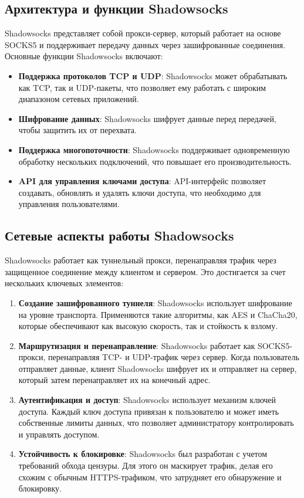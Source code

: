 \documentclass{SCWorks}
\begin{document}
\subsection{Архитектура и функции Shadowsocks}

Shadowsocks представляет собой прокси-сервер, который работает на основе SOCKS5 и поддерживает передачу данных через зашифрованные соединения. Основные функции Shadowsocks включают:

\begin{itemize}
    \item \textbf{Поддержка протоколов TCP и UDP}: Shadowsocks может обрабатывать как TCP, так и UDP-пакеты, что позволяет ему работать с широким диапазоном сетевых приложений.
    \item \textbf{Шифрование данных}: Shadowsocks шифрует данные перед передачей, чтобы защитить их от перехвата.
    \item \textbf{Поддержка многопоточности}: Shadowsocks поддерживает одновременную обработку нескольких подключений, что повышает его производительность.
    \item \textbf{API для управления ключами доступа}: API-интерфейс позволяет создавать, обновлять и удалять ключи доступа, что необходимо для управления пользователями.
\end{itemize}

\subsection{Сетевые аспекты работы Shadowsocks}
Shadowsocks работает как туннельный прокси, перенаправляя трафик через защищенное соединение между клиентом и сервером. Это достигается за счет нескольких ключевых элементов:

\begin{enumerate}
    \item \textbf{Создание зашифрованного туннеля}: Shadowsocks использует шифрование на уровне транспорта. Применяются такие алгоритмы, как AES и ChaCha20, которые обеспечивают как высокую скорость, так и стойкость к взлому.
    \item \textbf{Маршрутизация и перенаправление}: Shadowsocks работает как SOCKS5-прокси, перенаправляя TCP- и UDP-трафик через сервер. Когда пользователь отправляет данные, клиент Shadowsocks шифрует их и отправляет на сервер, который затем перенаправляет их на конечный адрес.
    \item \textbf{Аутентификация и доступ}: Shadowsocks использует механизм ключей доступа. Каждый ключ доступа привязан к пользователю и может иметь собственные лимиты данных, что позволяет администратору контролировать и управлять доступом.
    \item \textbf{Устойчивость к блокировке}: Shadowsocks был разработан с учетом требований обхода цензуры. Для этого он маскирует трафик, делая его схожим с обычным HTTPS-трафиком, что затрудняет его обнаружение и блокировку.
\end{enumerate}
\end{document}
